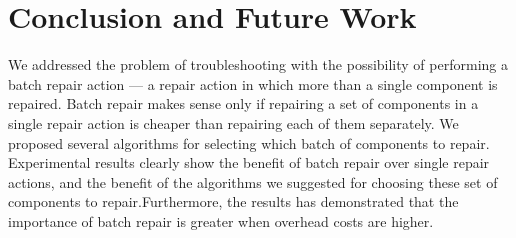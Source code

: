 \documentclass[a4paper,11pt]{report}
\begin{document}



\chapter{Conclusion and Future Work}

We addressed the problem of troubleshooting with the possibility of performing a batch repair action --- a repair action in which more than a single component is repaired. Batch repair makes sense only if repairing a set of components in a single repair action is cheaper than repairing each of them separately. We proposed several algorithms for selecting which batch of components to repair. Experimental results clearly show the benefit of batch repair over single repair actions, and the benefit of the algorithms we suggested for choosing these set of components to repair.Furthermore, the results has demonstrated that the importance of batch repair is greater when overhead costs are higher.  
\end{document}
